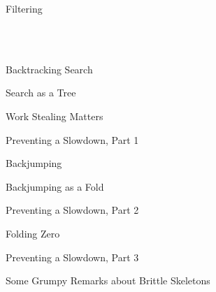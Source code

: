 \documentclass{beamer}
\begin{document}
\begin{frame}{Filtering}
    \\~

\end{frame}

\begin{frame}{Backtracking Search}

\end{frame}

\begin{frame}{Search as a Tree}
\end{frame}

\begin{frame}{Work Stealing Matters}
\end{frame}

\begin{frame}{Preventing a Slowdown, Part 1}
\end{frame}

\begin{frame}{Backjumping}
\end{frame}

\begin{frame}{Backjumping as a Fold}
\end{frame}

\begin{frame}{Preventing a Slowdown, Part 2}
\end{frame}

\begin{frame}{Folding Zero}
\end{frame}

\begin{frame}{Preventing a Slowdown, Part 3}
\end{frame}

\begin{frame}{Some Grumpy Remarks about Brittle Skeletons}
\end{frame}
\end{document}
